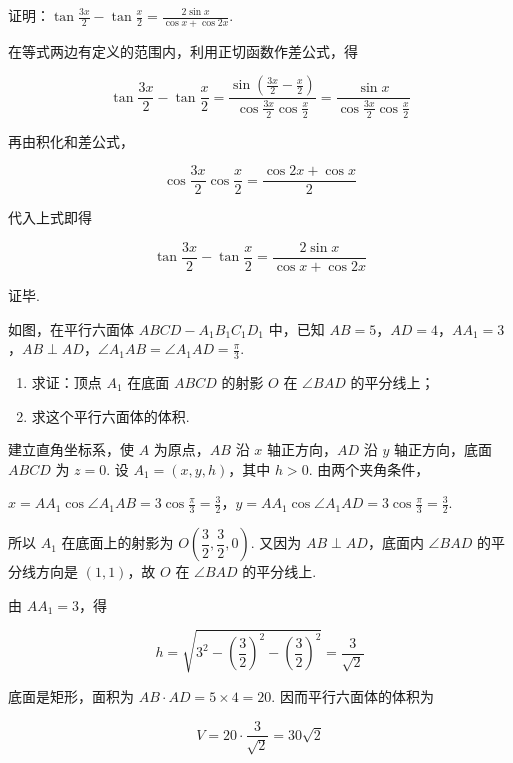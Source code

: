 \documentclass[UTF8,a4paper,oneside,11pt]{ctexbook}
\begin{document}
\begin{problem}
证明：\(\tan \frac{3x}{2} - \tan \frac{x}{2} = \frac{2\sin x}{\cos x + \cos 2x}\).
\end{problem}

\begin{solution}
在等式两边有定义的范围内，利用正切函数作差公式，得

\[\tan\frac{3x}{2}-\tan\frac{x}{2}=\frac{\sin\left(\frac{3x}{2}-\frac{x}{2}\right)}{\cos\frac{3x}{2}\cos\frac{x}{2}}=\frac{\sin x}{\cos\frac{3x}{2}\cos\frac{x}{2}}\]

再由积化和差公式，

\[\cos\frac{3x}{2}\cos\frac{x}{2}=\frac{\cos2x+\cos x}{2}\]

代入上式即得

\[\tan\frac{3x}{2}-\tan\frac{x}{2}=\frac{2\sin x}{\cos x+\cos2x}\]

证毕.
\end{solution}

\begin{problem}
如图，在平行六面体 \(ABCD - A_1B_1C_1D_1\) 中，已知 \(AB = 5\)，\(AD = 4\)，\(AA_1 = 3\)，\(AB \perp AD\)，\(\angle A_1AB = \angle A_1AD = \frac{\pi}{3}\).

\begin{enumerate}
\item 求证：顶点 \(A_1\) 在底面 \(ABCD\) 的射影 \(O\) 在 \(\angle BAD\) 的平分线上；
\item 求这个平行六面体的体积.
\end{enumerate}

\end{problem}

\begin{solution}
建立直角坐标系，使 \(A\) 为原点，\(AB\) 沿 \(x\) 轴正方向，\(AD\) 沿 \(y\) 轴正方向，底面 \(ABCD\) 为 \(z=0\). 设 \(A_1=(x,y,h)\)，其中 \(h>0\). 由两个夹角条件，

\(x=AA_1\cos\angle A_1AB=3\cos\frac\pi3=\frac32\)，\(y=AA_1\cos\angle A_1AD=3\cos\frac\pi3=\frac32\).

所以 \(A_1\) 在底面上的射影为 \(O\left(\dfrac32,\dfrac32,0\right)\). 又因为 \(AB\perp AD\)，底面内 \(\angle BAD\) 的平分线方向是 \((1,1)\)，故 \(O\) 在 \(\angle BAD\) 的平分线上.

由 \(AA_1=3\)，得

\[h=\sqrt{3^2-\left(\frac32\right)^2-\left(\frac32\right)^2}=\frac{3}{\sqrt2}\]

底面是矩形，面积为 \(AB\cdot AD=5\times4=20\). 因而平行六面体的体积为

\[V=20\cdot\frac{3}{\sqrt2}=30\sqrt2\]
\end{solution}
\end{document}
